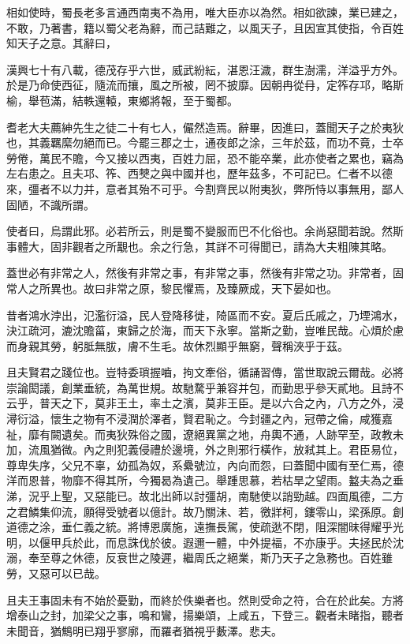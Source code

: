 相如使時，蜀長老多言通西南夷不為用，唯大臣亦以為然。相如欲諫，業已建之，不敢，乃著書，籍以蜀父老為辭，而己詰難之，以風天子，且因宣其使指，令百姓知天子之意。其辭曰，

漢興七十有八載，德茂存乎六世，威武紛紜，湛恩汪濊，群生澍濡，洋溢乎方外。於是乃命使西征，隨流而攘，風之所被，罔不披靡。因朝冉從冄，定筰存邛，略斯榆，舉苞滿，結軼還轅，東鄉將報，至于蜀都。

耆老大夫薦紳先生之徒二十有七人，儼然造焉。辭畢，因進曰，蓋聞天子之於夷狄也，其義羈縻勿絕而已。今罷三郡之士，通夜郎之涂，三年於茲，而功不竟，士卒勞倦，萬民不贍，今又接以西夷，百姓力屈，恐不能卒業，此亦使者之累也，竊為左右患之。且夫邛、筰、西僰之與中國并也，歷年茲多，不可記已。仁者不以德來，彊者不以力并，意者其殆不可乎。今割齊民以附夷狄，弊所恃以事無用，鄙人固陋，不識所謂。

使者曰，烏謂此邪。必若所云，則是蜀不變服而巴不化俗也。余尚惡聞若說。然斯事體大，固非觀者之所覯也。余之行急，其詳不可得聞已，請為大夫粗陳其略。

蓋世必有非常之人，然後有非常之事，有非常之事，然後有非常之功。非常者，固常人之所異也。故曰非常之原，黎民懼焉，及臻厥成，天下晏如也。

昔者鴻水浡出，氾濫衍溢，民人登降移徙，陭區而不安。夏后氏戚之，乃堙鴻水，決江疏河，漉沈贍菑，東歸之於海，而天下永寧。當斯之勤，豈唯民哉。心煩於慮而身親其勞，躬胝無胈，膚不生毛。故休烈顯乎無窮，聲稱浹乎于茲。

且夫賢君之踐位也。豈特委瑣握嚙，拘文牽俗，循誦習傳，當世取說云爾哉。必將崇論閎議，創業垂統，為萬世規。故馳騖乎兼容并包，而勤思乎參天貳地。且詩不云乎，普天之下，莫非王土，率土之濱，莫非王臣。是以六合之內，八方之外，浸潯衍溢，懷生之物有不浸潤於澤者，賢君恥之。今封疆之內，冠帶之倫，咸獲嘉祉，靡有闕遺矣。而夷狄殊俗之國，遼絕異黨之地，舟輿不通，人跡罕至，政教未加，流風猶微。內之則犯義侵禮於邊境，外之則邪行橫作，放弒其上。君臣易位，尊卑失序，父兄不辜，幼孤為奴，系纍號泣，內向而怨，曰蓋聞中國有至仁焉，德洋而恩普，物靡不得其所，今獨曷為遺己。舉踵思慕，若枯旱之望雨。盭夫為之垂涕，況乎上聖，又惡能已。故北出師以討彊胡，南馳使以誚勁越。四面風德，二方之君鱗集仰流，願得受號者以億計。故乃關沬、若，徼牂柯，鏤零山，梁孫原。創道德之涂，垂仁義之統。將博恩廣施，遠撫長駕，使疏逖不閉，阻深闇昧得耀乎光明，以偃甲兵於此，而息誅伐於彼。遐邇一體，中外提福，不亦康乎。夫拯民於沈溺，奉至尊之休德，反衰世之陵遲，繼周氏之絕業，斯乃天子之急務也。百姓雖勞，又惡可以已哉。

且夫王事固未有不始於憂勤，而終於佚樂者也。然則受命之符，合在於此矣。方將增泰山之封，加梁父之事，鳴和鸞，揚樂頌，上咸五，下登三。觀者未睹指，聽者未聞音，猶鷦明已翔乎寥廓，而羅者猶視乎藪澤。悲夫。

